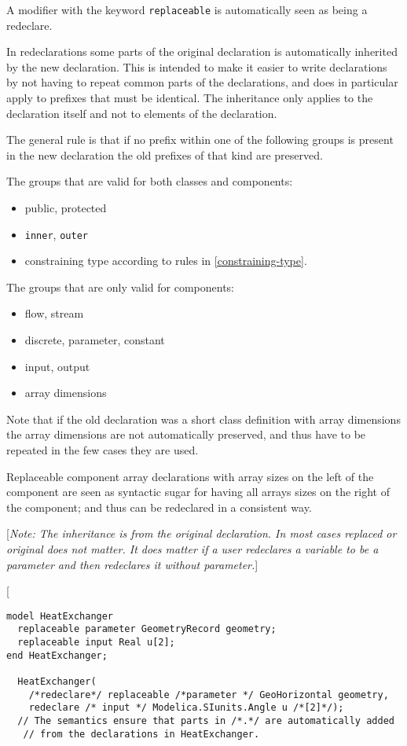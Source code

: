 A modifier with the keyword \lstinline!replaceable! is automatically seen as being a
redeclare.

In redeclarations some parts of the original declaration is
automatically inherited by the new declaration. This is intended to make
it easier to write declarations by not having to repeat common parts of
the declarations, and does in particular apply to prefixes that must be
identical. The inheritance only applies to the declaration itself and
not to elements of the declaration.

The general rule is that if no prefix within one of the following groups
is present in the new declaration the old prefixes of that kind are
preserved.

The groups that are valid for both classes and components:

\begin{itemize}
\item
  public, protected
\item
  \lstinline!inner!, \lstinline!outer!
\item
  constraining type according to rules in \autoref{constraining-type}.
\end{itemize}

The groups that are only valid for components:

\begin{itemize}
\item
  flow, stream
\item
  discrete, parameter, constant
\item
  input, output
\item
  array dimensions
\end{itemize}

Note that if the old declaration was a short class definition with array
dimensions the array dimensions are not automatically preserved, and
thus have to be repeated in the few cases they are used.

Replaceable component array declarations with array sizes on the left of
the component are seen as syntactic sugar for having all arrays sizes on
the right of the component; and thus can be redeclared in a consistent
way.

{[}\emph{Note: The inheritance is from the original declaration. In most
cases replaced or original does not matter. It does matter if a user
redeclares a variable to be a parameter and then redeclares it without
parameter.}{]}

{[}
\begin{lstlisting}[language=modelica]
model HeatExchanger
  replaceable parameter GeometryRecord geometry;
  replaceable input Real u[2];
end HeatExchanger;

  HeatExchanger(
    /*redeclare*/ replaceable /*parameter */ GeoHorizontal geometry,
    redeclare /* input */ Modelica.SIunits.Angle u /*[2]*/);
  // The semantics ensure that parts in /*.*/ are automatically added
   // from the declarations in HeatExchanger.
\end{lstlisting}

